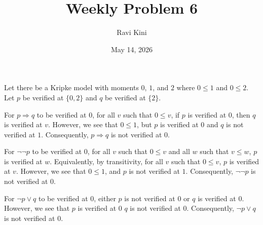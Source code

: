 \documentclass{article}
\title{Weekly Problem 6}
\author{Ravi Kini}
\date{May 14, 2026}
\begin{document}
\maketitle

\problem
Let there be a Kripke model with moments $0$, $1$, and $2$ where $0 \leq 1$ and $0 \leq 2$. Let $p$ be verified at $\{0, 2\}$ and $q$ be verified at $\{2\}$.

For $p \Rightarrow q$ to be verified at $0$, for all $v$ such that $0 \leq v$, if $p$ is verified at $0$, then $q$ is verified at $v$. However, we see that $0 \leq 1$, but $p$ is verified at $0$ and $q$ is not verified at $1$. Consequently, $p \Rightarrow q$ is not verified at $0$.

For $\lnot \lnot p$ to be verified at $0$, for all $v$ such that $0 \leq v$ and all $w$ such that $v \leq w$, $p$ is verified at $w$. Equivalently, by transitivity, for all $v$ such that $0 \leq v$, $p$ is verified at $v$. However, we see that $0 \leq 1$, and $p$ is not verified at $1$. Consequently, $\lnot \lnot p$ is not verified at $0$.

For $\lnot p \lor q$ to be verified at $0$, either $p$ is not verified at $0$ or $q$ is verified at $0$. However, we see that $p$ is verified at $0$ $q$ is not verified at $0$. Consequently, $\lnot p \lor q$ is not verified at $0$.
\end{document}
